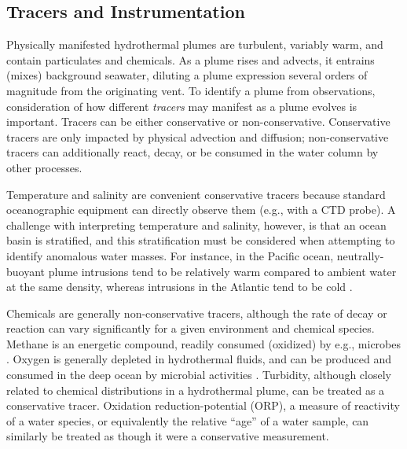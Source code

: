\subsection{Tracers and Instrumentation}
Physically manifested hydrothermal plumes are turbulent, variably warm, and contain particulates and chemicals.
As a plume rises and advects, it entrains (mixes) background seawater, diluting a plume expression several orders of magnitude from the originating vent.
To identify a plume from observations, consideration of how different \emph{tracers} may manifest as a plume evolves is important.
Tracers can be either conservative or non-conservative. 
Conservative tracers are only impacted by physical advection and diffusion; non-conservative tracers can additionally react, decay, or be consumed in the water column by other processes.

Temperature and salinity are convenient conservative tracers because standard oceanographic equipment can directly observe them (e.g., with a CTD probe).
A challenge with interpreting temperature and salinity, however, is that an ocean basin is stratified, and this stratification must be considered when attempting to identify anomalous water masses. For instance, in the Pacific ocean, neutrally-buoyant plume intrusions tend to be relatively warm compared to ambient water at the same density, whereas intrusions in the Atlantic tend to be cold \autocite{speer1989model}.

Chemicals are generally non-conservative tracers, although the rate of decay or reaction can vary significantly for a given environment and chemical species. Methane is an energetic compound, readily consumed (oxidized) by e.g., microbes \autocite{petersen2009methanotrophic}. Oxygen is generally depleted in hydrothermal fluids, and can be produced and consumed in the deep ocean by microbial activities \autocite{johnson1986situ,smith1985maerozooplankton}. Turbidity, although closely related to chemical distributions in a hydrothermal plume, can be treated as a conservative tracer. Oxidation reduction-potential (ORP), a measure of reactivity of a water species, or equivalently the relative ``age'' of a water sample, can similarly be treated as though it were a conservative measurement.

